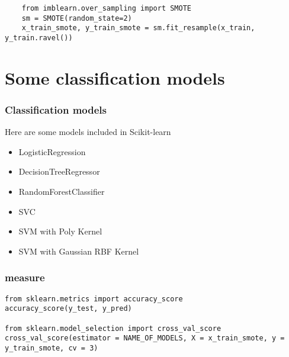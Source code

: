 \documentclass[10pt]{beamer}
\theoremstyle{definition}
\theoremstyle{remark}
\numberwithin{equation}{section}
\begin{document}
\begin{frame}[fragile]

\begin{lstlisting}
	from imblearn.over_sampling import SMOTE
	sm = SMOTE(random_state=2)
	x_train_smote, y_train_smote = sm.fit_resample(x_train, y_train.ravel())
\end{lstlisting}

\end{frame}

\section{Some classification models}
\begin{frame}
\frametitle{Classification models}

Here are some models included in Scikit-learn

\begin{itemize}
	\item LogisticRegression
	
	\item DecisionTreeRegressor
	
	\item  RandomForestClassifier
	
	\item SVC
	
	\item SVM with Poly Kernel
	
	\item SVM with Gaussian RBF Kernel
\end{itemize}
\end{frame}

\begin{frame}[fragile]
	\frametitle{measure}
	\begin{lstlisting}
from sklearn.metrics import accuracy_score
accuracy_score(y_test, y_pred)

from sklearn.model_selection import cross_val_score
cross_val_score(estimator = NAME_OF_MODELS, X = x_train_smote, y = y_train_smote, cv = 3) 
	\end{lstlisting}
\end{frame}
\end{document}
